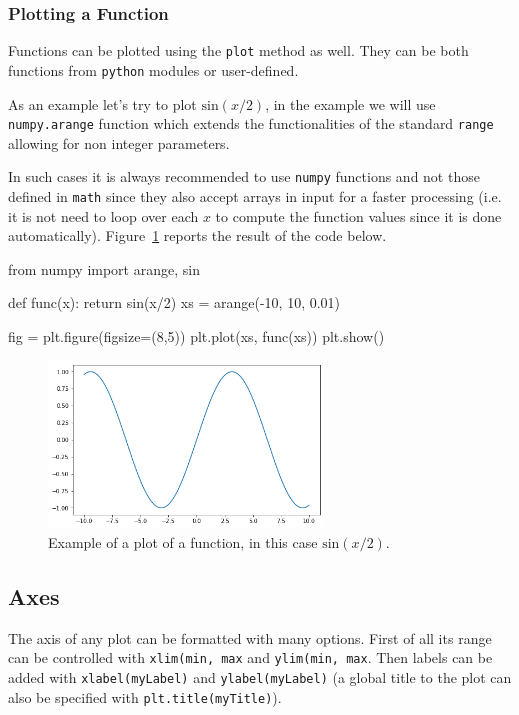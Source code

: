 \subsubsection{Plotting a Function}\label{plotting-a-function}

Functions can be plotted using the \texttt{plot} method as well. They can be both functions from \texttt{python} modules or user-defined.

As an example let's try to plot $\mathrm{sin}(x/2)$, in the example we will use \texttt{numpy.arange} function which extends the functionalities of the standard \texttt{range} allowing for non integer parameters.

In such cases it is always recommended to use \texttt{numpy} functions and not those defined in \texttt{math} since they also accept arrays in input for a faster processing (i.e. it is not need to loop over each $x$ to compute the function values since it is done automatically).
Figure~\ref{fig:sinx_x} reports the result of the code below.

\begin{ipython}
from numpy import arange, sin

def func(x):
    return sin(x/2)
xs = arange(-10, 10, 0.01)

fig = plt.figure(figsize=(8,5))
plt.plot(xs, func(xs))
plt.show()
\end{ipython}

\begin{figure}[htb]
	\centering
	\includegraphics[width=0.65\textwidth]{figures/sinx_x}
	\caption{Example of a plot of a function, in this case \(\mathrm{sin}(x/2)\).}
	\label{fig:sinx_x}
\end{figure}

\subsection{Axes}\label{axes}

The axis of any plot can be formatted with many options.
First of all its range can be controlled with \texttt{xlim(min, max} and \texttt{ylim(min, max}. Then labels can be added with \texttt{xlabel(myLabel)} and \texttt{ylabel(myLabel)} (a global title to the plot can also be specified with \texttt{plt.title(myTitle)}).

